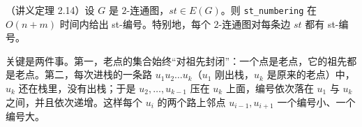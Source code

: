 
\begin{theorem}\label{thm:st-numbering:correct}
（讲义定理 2.14）设 $G$ 是 $2$-连通图，$st\in E(G)$。则 \texttt{st\_numbering} 在 $O(n+m)$ 时间内给出 st-编号。特别地，每个 $2$-连通图对每条边 $st$ 都有 st-编号。
\end{theorem}

\begin{remark}[证明思路]
关键是两件事。第一，老点的集合始终“对祖先封闭”：一个点是老点，它的祖先都是老点。第二，每次进栈的一条路 $u_1u_2\dots u_k$（$u_1$ 刚出栈，$u_k$ 是原来的老点）中，$u_k$ 还在栈里，没有出栈；于是 $u_2,\dots,u_{k-1}$ 压在 $u_k$ 上面，编号依次落在 $u_1$ 与 $u_k$ 之间，并且依次递增。这样每个 $u_i$ 的两个路上邻点 $u_{i-1},u_{i+1}$ 一个编号小、一个编号大。
\end{remark}


